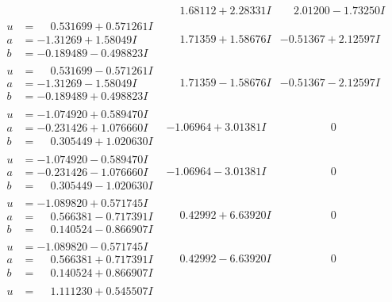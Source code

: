 \documentclass[1p]{elsarticle_modified}
\theoremstyle{definition}
\begin{document}
$$\begin{array}{c|c|c}
 & \phantom{-}1.68112 + 2.28331 I & \phantom{-}2.01200 - 1.73250 I \\ \hline\begin{aligned}
u &= \phantom{-}0.531699 + 0.571261 I \\
a &= -1.31269 + 1.58049 I \\
b &= -0.189489 - 0.498823 I\end{aligned}
 & \phantom{-}1.71359 + 1.58676 I & -0.51367 + 2.12597 I \\ \hline\begin{aligned}
u &= \phantom{-}0.531699 - 0.571261 I \\
a &= -1.31269 - 1.58049 I \\
b &= -0.189489 + 0.498823 I\end{aligned}
 & \phantom{-}1.71359 - 1.58676 I & -0.51367 - 2.12597 I \\ \hline\begin{aligned}
u &= -1.074920 + 0.589470 I \\
a &= -0.231426 + 1.076660 I \\
b &= \phantom{-}0.305449 + 1.020630 I\end{aligned}
 & -1.06964 + 3.01381 I & \phantom{-0.000000 } 0 \\ \hline\begin{aligned}
u &= -1.074920 - 0.589470 I \\
a &= -0.231426 - 1.076660 I \\
b &= \phantom{-}0.305449 - 1.020630 I\end{aligned}
 & -1.06964 - 3.01381 I & \phantom{-0.000000 } 0 \\ \hline\begin{aligned}
u &= -1.089820 + 0.571745 I \\
a &= \phantom{-}0.566381 - 0.717391 I \\
b &= \phantom{-}0.140524 - 0.866907 I\end{aligned}
 & \phantom{-}0.42992 + 6.63920 I & \phantom{-0.000000 } 0 \\ \hline\begin{aligned}
u &= -1.089820 - 0.571745 I \\
a &= \phantom{-}0.566381 + 0.717391 I \\
b &= \phantom{-}0.140524 + 0.866907 I\end{aligned}
 & \phantom{-}0.42992 - 6.63920 I & \phantom{-0.000000 } 0 \\ \hline\begin{aligned}
u &= \phantom{-}1.111230 + 0.545507 I \\

\end{aligned}
\end{array}$$
\end{document}
